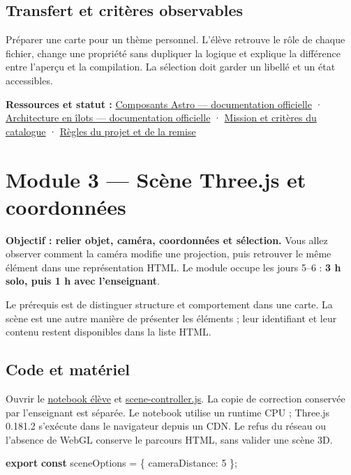 \documentclass[
  canadien,
  11pt,
  a4paper,
]{report}
\newenvironment{Shaded}{}{}
\newcommand{\DataTypeTok}[1]{\textcolor[rgb]{0.56,0.13,0.00}{#1}}
\newcommand{\DecValTok}[1]{\textcolor[rgb]{0.25,0.63,0.44}{#1}}
\newcommand{\ImportTok}[1]{\textcolor[rgb]{0.00,0.50,0.00}{\textbf{#1}}}
\newcommand{\KeywordTok}[1]{\textcolor[rgb]{0.00,0.44,0.13}{\textbf{#1}}}
\newcommand{\NormalTok}[1]{#1}
\newcommand{\OperatorTok}[1]{\textcolor[rgb]{0.40,0.40,0.40}{#1}}
\begin{document}
\section{Transfert et critères
observables}\label{transfert-et-crituxe8res-observables-1}

Préparer une carte pour un thème personnel. L'élève retrouve le rôle de
chaque fichier, change une propriété sans dupliquer la logique et
explique la différence entre l'aperçu et la compilation. La sélection
doit garder un libellé et un état accessibles.

\textbf{Ressources et statut :}
\href{https://docs.astro.build/en/basics/astro-components/}{Composants
Astro --- documentation officielle} ·
\href{https://docs.astro.build/en/concepts/islands/}{Architecture en
îlots --- documentation officielle} ·
\href{../../../../../packages/learning/src/catalog.ts}{Mission et
critères du catalogue} · \href{../../PROJECT.md}{Règles du projet et de
la remise}

\chapter{Module 3 --- Scène Three.js et
coordonnées}\label{module-3-scuxe8ne-three.js-et-coordonnuxe9es}

\textbf{Objectif : relier objet, caméra, coordonnées et sélection.} Vous
allez observer comment la caméra modifie une projection, puis retrouver
le même élément dans une représentation HTML. Le module occupe les jours
5--6 : \textbf{3 h solo, puis 1 h avec l'enseignant}.

Le prérequis est de distinguer structure et comportement dans une carte.
La scène est une autre manière de présenter les éléments ; leur
identifiant et leur contenu restent disponibles dans la liste HTML.

\section{Code et matériel}\label{code-et-matuxe9riel}

Ouvrir le \href{../../notebooks/module-3.ipynb}{notebook élève} et
\href{../../frontend/module-3/scene-controller.js}{scene-controller.js}.
La copie de correction conservée par l'enseignant est séparée. Le
notebook utilise un runtime CPU ; Three.js 0.181.2 s'exécute dans le
navigateur depuis un CDN. Le refus du réseau ou l'absence de WebGL
conserve le parcours HTML, sans valider une scène 3D.

\begin{Shaded}
\begin{Highlighting}[]
\ImportTok{export} \KeywordTok{const}\NormalTok{ sceneOptions }\OperatorTok{=}\NormalTok{ \{ }\DataTypeTok{cameraDistance}\OperatorTok{:} \DecValTok{5}\NormalTok{ \}}\OperatorTok{;}
\end{Highlighting}
\end{Shaded}
\end{document}
